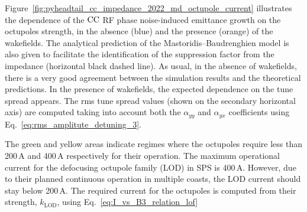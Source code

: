 Figure~\ref{fig:pyheadtail_cc_impedance_2022_md_octupole_current} illustrates the dependence of the ${\mathrm{CC}}$ RF phase noise-induced emittance growth on the octupoles strength, in the absence (blue) and the presence (orange) of the wakefields. The analytical prediction of the Mastoridis--Baudrenghien model is also given to facilitate the identification of the suppression factor from the impedance (horizontal black dashed line). As usual, in the absence of wakefields, there is a very good agreement between the simulation results and the theoretical predictions. In the presence of wakefields, the expected dependence on the tune spread appears. The rms tune spread values (shown on the secondary horizontal axis) are computed taking into account both the $\alpha_{{yy}}$ and $\alpha_{{yx}}$ coefficients using Eq.~\eqref{eq:rms_amplitute_detuning_3}.

The green and yellow areas indicate regimes where the octupoles require less than 200\,A and 400\,A respectively for their operation. The maximum operational current for the defocusing octupole family (LOD) in SPS is 400\,A. However, due to their planned continuous operation in multiple coasts, the LOD current should stay below 200\,A. The required current for the octupoles is computed from their strength, $k_\mathrm{LOD}$, using Eq.~\eqref{eq:I_vs_B3_relation_lof}


